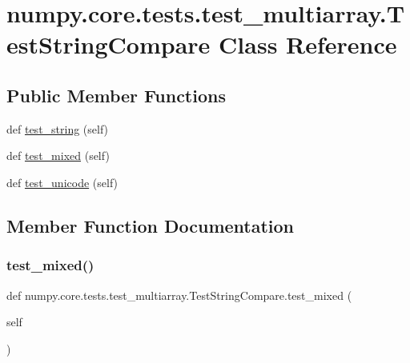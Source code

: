 \hypertarget{classnumpy_1_1core_1_1tests_1_1test__multiarray_1_1TestStringCompare}{}\section{numpy.\+core.\+tests.\+test\+\_\+multiarray.\+Test\+String\+Compare Class Reference}
\label{classnumpy_1_1core_1_1tests_1_1test__multiarray_1_1TestStringCompare}
\subsection*{Public Member Functions}
\begin{DoxyCompactItemize}
\item 
def \hyperlink{classnumpy_1_1core_1_1tests_1_1test__multiarray_1_1TestStringCompare_ac4be5fe120bfe60077ec99d8c9dfdd15}{test\+\_\+string} (self)
\item 
def \hyperlink{classnumpy_1_1core_1_1tests_1_1test__multiarray_1_1TestStringCompare_a39be00e19567184f30654a1fa67ad654}{test\+\_\+mixed} (self)
\item 
def \hyperlink{classnumpy_1_1core_1_1tests_1_1test__multiarray_1_1TestStringCompare_a41cff7775e57cc9aada0a1a7ad6a2fe3}{test\+\_\+unicode} (self)
\end{DoxyCompactItemize}


\subsection{Member Function Documentation}
\mbox{\label{classnumpy_1_1core_1_1tests_1_1test__multiarray_1_1TestStringCompare_a39be00e19567184f30654a1fa67ad654}} 
\subsubsection{\texorpdfstring{test\+\_\+mixed()}{test\_mixed()}}
{\footnotesize\ttfamily def numpy.\+core.\+tests.\+test\+\_\+multiarray.\+Test\+String\+Compare.\+test\+\_\+mixed (\begin{DoxyParamCaption}\item[{}]{self }\end{DoxyParamCaption})}

